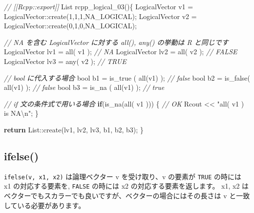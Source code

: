 \documentclass[]{book}
\newenvironment{Shaded}{\begin{snugshade}}{\end{snugshade}}
\newcommand{\CommentTok}[1]{\textcolor[rgb]{0.56,0.35,0.01}{\textit{#1}}}
\newcommand{\ControlFlowTok}[1]{\textcolor[rgb]{0.13,0.29,0.53}{\textbf{#1}}}
\newcommand{\DataTypeTok}[1]{\textcolor[rgb]{0.13,0.29,0.53}{#1}}
\newcommand{\DecValTok}[1]{\textcolor[rgb]{0.00,0.00,0.81}{#1}}
\newcommand{\NormalTok}[1]{#1}
\newcommand{\SpecialCharTok}[1]{\textcolor[rgb]{0.00,0.00,0.00}{#1}}
\newcommand{\StringTok}[1]{\textcolor[rgb]{0.31,0.60,0.02}{#1}}
\begin{document}
\begin{Shaded}
\begin{Highlighting}[]
\CommentTok{// [[Rcpp::export]]}
\NormalTok{List rcpp_logical_03()\{}
\NormalTok{  LogicalVector v1 = LogicalVector::create(}\DecValTok{1}\NormalTok{,}\DecValTok{1}\NormalTok{,}\DecValTok{1}\NormalTok{,NA_LOGICAL);}
\NormalTok{  LogicalVector v2 = LogicalVector::create(}\DecValTok{0}\NormalTok{,}\DecValTok{1}\NormalTok{,}\DecValTok{0}\NormalTok{,NA_LOGICAL);}
  
  \CommentTok{// NA を含む LogicalVector に対する all(), any() の挙動は R と同じです}
\NormalTok{  LogicalVector lv1 = all( v1 );   }\CommentTok{// NA}
\NormalTok{  LogicalVector lv2 = all( v2 );   }\CommentTok{// FALSE}
\NormalTok{  LogicalVector lv3 = any( v2 ); }\CommentTok{// TRUE }
  
  \CommentTok{// bool に代入する場合}
  \DataTypeTok{bool}\NormalTok{ b1 = is_true ( all(v1) );  }\CommentTok{// false}
  \DataTypeTok{bool}\NormalTok{ b2 = is_false( all(v1) );  }\CommentTok{// false}
  \DataTypeTok{bool}\NormalTok{ b3 = is_na   ( all(v1) );  }\CommentTok{// true}

  \CommentTok{// if 文の条件式で用いる場合}
  \ControlFlowTok{if}\NormalTok{(is_na(all( v1 ))) \{ }\CommentTok{// OK }
\NormalTok{    Rcout << }\StringTok{"all( v1 ) is NA}\SpecialCharTok{\textbackslash{}n}\StringTok{"}\NormalTok{;}
\NormalTok{  \}}
  
  \ControlFlowTok{return}\NormalTok{ List::create(lv1, lv2, lv3, b1, b2, b3);}
\NormalTok{\}}
\end{Highlighting}
\end{Shaded}

\hypertarget{ifelse}{%
\subsection{ifelse()}\label{ifelse}}

\texttt{ifelse(v,\ x1,\ x2)} は論理ベクター v を受け取り、v の要素が \texttt{TRUE} の時には x1 の対応する要素を, \texttt{FALSE} の時には x2 の対応する要素を返します。 x1, x2 はベクターでもスカラーでも良いですが、ベクターの場合にはその長さは v と一致している必要があります。
\end{document}
